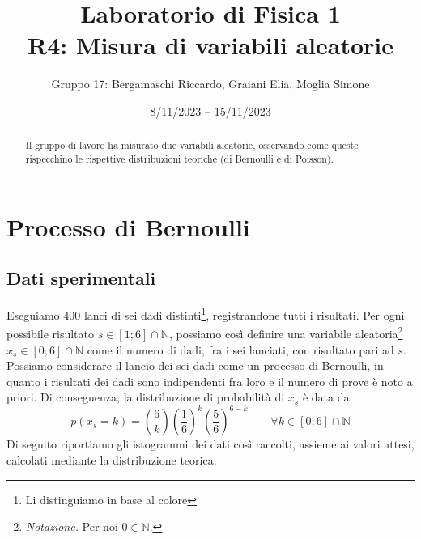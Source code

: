 \documentclass{article}
\title{
    Laboratorio di Fisica 1\\
    R4: Misura di variabili aleatorie
}
\author{Gruppo 17: Bergamaschi Riccardo, Graiani Elia, Moglia Simone}
\date{8/11/2023 – 15/11/2023}
\begin{document}
\maketitle

\begin{abstract}
    Il gruppo di lavoro ha misurato due variabili aleatorie, osservando come queste
    rispecchino le rispettive distribuzioni teoriche (di Bernoulli e di Poisson).
\end{abstract}

\section{Processo di Bernoulli}

\subsection{Dati sperimentali}
Eseguiamo 400 lanci di sei dadi distinti\footnote{Li distinguiamo in base al colore},
registrandone tutti i risultati.
Per ogni possibile risultato $s\in\left[1;6\right]\cap\mathbb{N}$, possiamo così
definire una variabile aleatoria\footnote{\emph{Notazione.} Per noi $0\in\mathbb{N}$.}
$x_s\in\left[0;6\right]\cap\mathbb{N}$ come il
numero di dadi, fra i sei lanciati, con risultato pari ad $s$.
Possiamo considerare il lancio dei sei dadi come un processo di Bernoulli,
in quanto i risultati dei dadi sono indipendenti fra loro e il numero di prove è noto
a priori. Di conseguenza, la distribuzione di probabilità di $x_s$ è data da:
\[
    p \left(x_s=k\right) =
        \binom{6}{k}
        \left(\frac{1}{6}\right)^k
        \left(\frac{5}{6}\right)^{6-k}
        \qquad\forall k\in\left[0;6\right]\cap\mathbb{N}
\]
Di seguito riportiamo gli istogrammi dei dati così raccolti, assieme ai valori attesi,
calcolati mediante la distribuzione teorica.
\end{document}
